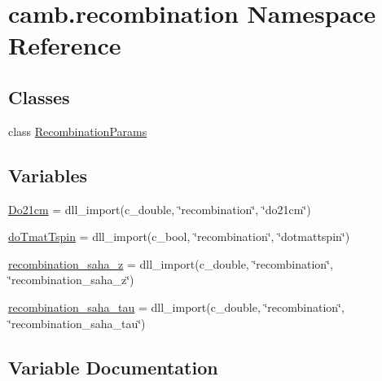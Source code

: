 \hypertarget{namespacecamb_1_1recombination}{}\section{camb.\+recombination Namespace Reference}
\label{namespacecamb_1_1recombination}
\subsection*{Classes}
\begin{DoxyCompactItemize}
\item 
class \mbox{\hyperlink{classcamb_1_1recombination_1_1RecombinationParams}{Recombination\+Params}}
\end{DoxyCompactItemize}
\subsection*{Variables}
\begin{DoxyCompactItemize}
\item 
\mbox{\hyperlink{namespacecamb_1_1recombination_a2516cd5ae712d60caacba89cea86c5ba}{Do21cm}} = dll\+\_\+import(c\+\_\+double, \char`\"{}recombination\char`\"{}, \char`\"{}do21cm\char`\"{})
\item 
\mbox{\hyperlink{namespacecamb_1_1recombination_a0d3125fac6b50e4dbfde41dfef612d6c}{do\+Tmat\+Tspin}} = dll\+\_\+import(c\+\_\+bool, \char`\"{}recombination\char`\"{}, \char`\"{}dotmattspin\char`\"{})
\item 
\mbox{\hyperlink{namespacecamb_1_1recombination_ac887c77d593685cc39f1725694443ff9}{recombination\+\_\+saha\+\_\+z}} = dll\+\_\+import(c\+\_\+double, \char`\"{}recombination\char`\"{}, \char`\"{}recombination\+\_\+saha\+\_\+z\char`\"{})
\item 
\mbox{\hyperlink{namespacecamb_1_1recombination_a508c1b0e5a8aa29a9590d17494719033}{recombination\+\_\+saha\+\_\+tau}} = dll\+\_\+import(c\+\_\+double, \char`\"{}recombination\char`\"{}, \char`\"{}recombination\+\_\+saha\+\_\+tau\char`\"{})
\end{DoxyCompactItemize}


\subsection{Variable Documentation}
\mbox{\label{namespacecamb_1_1recombination_a2516cd5ae712d60caacba89cea86c5ba}} 
